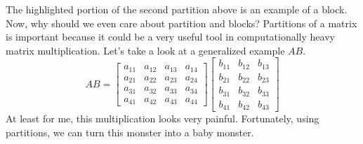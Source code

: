 \documentclass[../main.tex]{subfiles}
\begin{document}
The highlighted portion of the second partition above is an example
of a block. Now, why should we even care about partition and blocks?
Partitions of a matrix is important because it could be a very
useful tool in computationally heavy matrix multiplication.
Let's take a look at a generalized example $AB$.
\[
AB =
\begin{bmatrix}
    a_{11} & a_{12} & a_{13} & a_{14} \\
    a_{21} & a_{22} & a_{23} & a_{24} \\
    a_{31} & a_{32} & a_{33} & a_{34} \\
    a_{41} & a_{42} & a_{43} & a_{44}
\end{bmatrix}
\begin{bmatrix}
    b_{11} & b_{12} & b_{13} \\
    b_{21} & b_{22} & b_{23} \\
    b_{31} & b_{32} & b_{33} \\
    b_{41} & b_{42} & b_{43}
\end{bmatrix}
\]
At least for me, this multiplication looks very painful. Fortunately,
using partitions, we can turn this monster into a baby monster.
\end{document}
